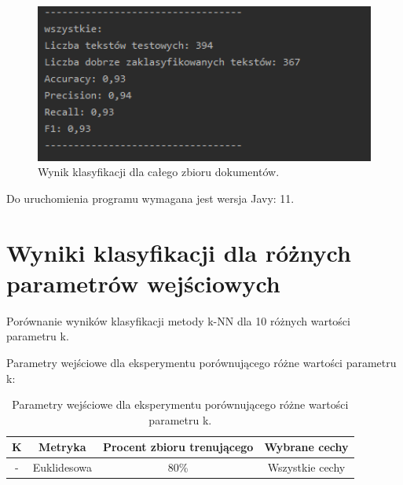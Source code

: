 \documentclass{classrep}
\begin{document}
\begin{figure}[h!]
 \centering
 \includegraphics[width=14cm]{wynik.png}
 \vspace{-0.3cm}
 \caption{Wynik klasyfikacji dla całego zbioru dokumentów.}
 \label{Wynik klasyfikacji.}
\end{figure}
\newpage

Do uruchomienia programu wymagana jest wersja Javy: 11. 



\section{Wyniki klasyfikacji dla różnych parametrów wejściowych}

Porównanie wyników klasyfikacji metody k-NN dla 10 różnych wartości parametru k. 

Parametry wejściowe dla eksperymentu porównującego różne wartości parametru k:
 
\begin{table}[h!]
\caption{Parametry wejściowe dla eksperymentu porównującego różne wartości parametru k. }
\centering
\vspace{0.1cm}
 \begin{tabular}{c c c c}
    \textbf{K} & \textbf{Metryka}   & \textbf{Procent zbioru trenującego}  & \textbf{Wybrane cechy}   \\
\hline
- & Euklidesowa & 80\% &  Wszystkie cechy\\
\end {tabular}
\label {Parametry wejściowe dla eksperymentu porównującego różne wartości parametru k. }
\end{table}
\end{document}

